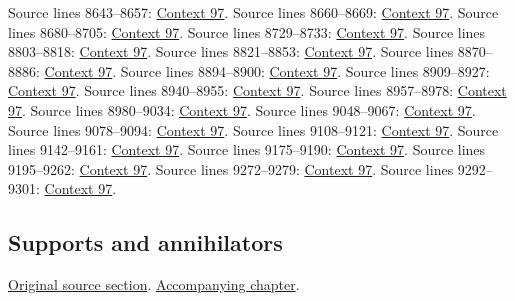 \begin{AlgebraSourceRoutes}
 Source lines 8643--8657: \hyperlink{algebra-context-097}{Context 97}.
 Source lines 8660--8669: \hyperlink{algebra-context-097}{Context 97}.
 Source lines 8680--8705: \hyperlink{algebra-context-097}{Context 97}.
 Source lines 8729--8733: \hyperlink{algebra-context-097}{Context 97}.
 Source lines 8803--8818: \hyperlink{algebra-context-097}{Context 97}.
 Source lines 8821--8853: \hyperlink{algebra-context-097}{Context 97}.
 Source lines 8870--8886: \hyperlink{algebra-context-097}{Context 97}.
 Source lines 8894--8900: \hyperlink{algebra-context-097}{Context 97}.
 Source lines 8909--8927: \hyperlink{algebra-context-097}{Context 97}.
 Source lines 8940--8955: \hyperlink{algebra-context-097}{Context 97}.
 Source lines 8957--8978: \hyperlink{algebra-context-097}{Context 97}.
 Source lines 8980--9034: \hyperlink{algebra-context-097}{Context 97}.
 Source lines 9048--9067: \hyperlink{algebra-context-097}{Context 97}.
 Source lines 9078--9094: \hyperlink{algebra-context-097}{Context 97}.
 Source lines 9108--9121: \hyperlink{algebra-context-097}{Context 97}.
 Source lines 9142--9161: \hyperlink{algebra-context-097}{Context 97}.
 Source lines 9175--9190: \hyperlink{algebra-context-097}{Context 97}.
 Source lines 9195--9262: \hyperlink{algebra-context-097}{Context 97}.
 Source lines 9272--9279: \hyperlink{algebra-context-097}{Context 97}.
 Source lines 9292--9301: \hyperlink{algebra-context-097}{Context 97}.
\end{AlgebraSourceRoutes}

\subsection{Supports and annihilators}
\hypertarget{algebra-source-section-supp-and-ann}{}
\noindent\href{https://github.com/stacks/stacks-project/blob/a04446e57ec1fbc252a871afcec7752fb2807b14/algebra.tex\#L9307}{Original source section}. \href{algebra.pdf\#nameddest=section-supp-and-ann}{Accompanying chapter}.

